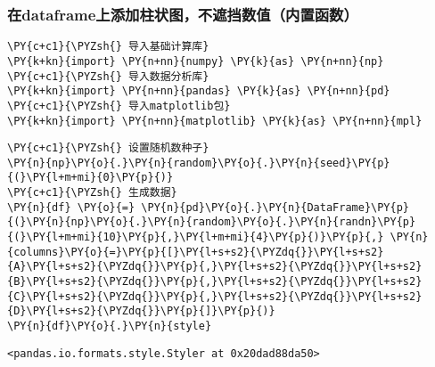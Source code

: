     \hypertarget{ux5728dataframeux4e0aux6dfbux52a0ux67f1ux72b6ux56feux4e0dux906eux6321ux6570ux503cux5185ux7f6eux51fdux6570}{%
\subsubsection{在dataframe上添加柱状图，不遮挡数值（内置函数）}\label{ux5728dataframeux4e0aux6dfbux52a0ux67f1ux72b6ux56feux4e0dux906eux6321ux6570ux503cux5185ux7f6eux51fdux6570}}

    \begin{tcolorbox}[breakable, size=fbox, boxrule=1pt, pad at break*=1mm,colback=cellbackground, colframe=cellborder]
\begin{Verbatim}[commandchars=\\\{\}]
\PY{c+c1}{\PYZsh{} 导入基础计算库}
\PY{k+kn}{import} \PY{n+nn}{numpy} \PY{k}{as} \PY{n+nn}{np}
\PY{c+c1}{\PYZsh{} 导入数据分析库}
\PY{k+kn}{import} \PY{n+nn}{pandas} \PY{k}{as} \PY{n+nn}{pd}
\PY{c+c1}{\PYZsh{} 导入matplotlib包}
\PY{k+kn}{import} \PY{n+nn}{matplotlib} \PY{k}{as} \PY{n+nn}{mpl}
\end{Verbatim}
\end{tcolorbox}

    \begin{tcolorbox}[breakable, size=fbox, boxrule=1pt, pad at break*=1mm,colback=cellbackground, colframe=cellborder]
\begin{Verbatim}[commandchars=\\\{\}]
\PY{c+c1}{\PYZsh{} 设置随机数种子}
\PY{n}{np}\PY{o}{.}\PY{n}{random}\PY{o}{.}\PY{n}{seed}\PY{p}{(}\PY{l+m+mi}{0}\PY{p}{)}
\PY{c+c1}{\PYZsh{} 生成数据}
\PY{n}{df} \PY{o}{=} \PY{n}{pd}\PY{o}{.}\PY{n}{DataFrame}\PY{p}{(}\PY{n}{np}\PY{o}{.}\PY{n}{random}\PY{o}{.}\PY{n}{randn}\PY{p}{(}\PY{l+m+mi}{10}\PY{p}{,}\PY{l+m+mi}{4}\PY{p}{)}\PY{p}{,} \PY{n}{columns}\PY{o}{=}\PY{p}{[}\PY{l+s+s2}{\PYZdq{}}\PY{l+s+s2}{A}\PY{l+s+s2}{\PYZdq{}}\PY{p}{,}\PY{l+s+s2}{\PYZdq{}}\PY{l+s+s2}{B}\PY{l+s+s2}{\PYZdq{}}\PY{p}{,}\PY{l+s+s2}{\PYZdq{}}\PY{l+s+s2}{C}\PY{l+s+s2}{\PYZdq{}}\PY{p}{,}\PY{l+s+s2}{\PYZdq{}}\PY{l+s+s2}{D}\PY{l+s+s2}{\PYZdq{}}\PY{p}{]}\PY{p}{)}
\PY{n}{df}\PY{o}{.}\PY{n}{style}
\end{Verbatim}
\end{tcolorbox}

            \begin{tcolorbox}[breakable, size=fbox, boxrule=.5pt, pad at break*=1mm, opacityfill=0]
\begin{Verbatim}[commandchars=\\\{\}]
<pandas.io.formats.style.Styler at 0x20dad88da50>
\end{Verbatim}
\end{tcolorbox}
        
